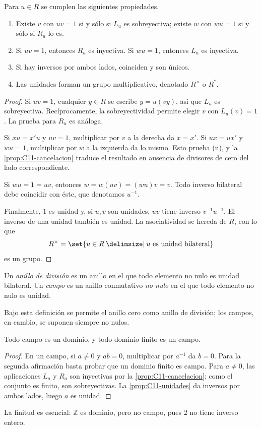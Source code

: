 \begin{prop}\label{prop:C11-unidades}
Para $u\in R$ se cumplen las siguientes propiedades.
\begin{enumerate}[label=\textup{(\roman*)}]
\item Existe $v$ con $uv=1$ si y sólo si $L_u$ es sobreyectiva; existe $w$ con $wu=1$ si y sólo si $R_u$ lo es.
\item Si $uv=1$, entonces $R_u$ es inyectiva. Si $wu=1$, entonces $L_u$ es inyectiva.
\item Si hay inversos por ambos lados, coinciden y son únicos.
\item Las unidades forman un grupo multiplicativo, denotado $R^\times$ o $R^*$.
\end{enumerate}
\end{prop}
\begin{proof}
Si $uv=1$, cualquier $y\in R$ se escribe $y=u(vy)$, así que $L_u$ es sobreyectiva. Recíprocamente, la sobreyectividad permite elegir $v$ con $L_u(v)=1$. La prueba para $R_u$ es análoga.

Si $xu=x'u$ y $uv=1$, multiplicar por $v$ a la derecha da $x=x'$. Si $ux=ux'$ y $wu=1$, multiplicar por $w$ a la izquierda da lo mismo. Esto prueba (ii), y la \cref{prop:C11-cancelacion} traduce el resultado en ausencia de divisores de cero del lado correspondiente.

Si $wu=1=uv$, entonces $w=w(uv)=(wu)v=v$. Todo inverso bilateral debe coincidir con éste, que denotamos $u^{-1}$.

Finalmente, $1$ es unidad y, si $u,v$ son unidades, $uv$ tiene inverso $v^{-1}u^{-1}$. El inverso de una unidad también es unidad. La asociatividad se hereda de $R$, con lo que
\[
R^\times=\set{u\in R\given u\text{ es unidad bilateral}}
\]
es un grupo.
\end{proof}

\begin{defi}
Un \emph{anillo de división} es un anillo en el que todo elemento no nulo es unidad bilateral. Un \emph{campo} es un anillo conmutativo \emph{no nulo} en el que todo elemento no nulo es unidad.
\end{defi}
Bajo esta definición se permite el anillo cero como anillo de división; los campos, en cambio, se suponen siempre no nulos.

\begin{prop}\label{prop:C11-finito}
Todo campo es un dominio, y todo dominio finito es un campo.
\end{prop}
\begin{proof}
En un campo, si $a\ne0$ y $ab=0$, multiplicar por $a^{-1}$ da $b=0$. Para la segunda afirmación basta probar que un dominio finito es campo. Para $a\ne0$, las aplicaciones $L_a$ y $R_a$ son inyectivas por la \cref{prop:C11-cancelacion}; como el conjunto es finito, son sobreyectivas. La \cref{prop:C11-unidades} da inversos por ambos lados, luego $a$ es unidad.
\end{proof}
La finitud es esencial: $\mathbb Z$ es dominio, pero no campo, pues $2$ no tiene inverso entero.


